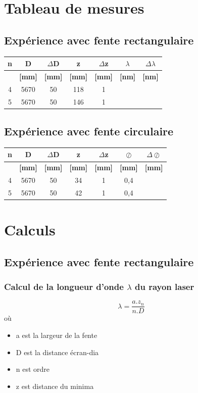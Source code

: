\documentclass[11pt,a4paper]{report}
\begin{document}
	\section{Tableau de mesures}
	\subsection{Expérience avec fente rectangulaire}
	\begin{center}	
	\begin{tabular}{|c|c|c|c|c|c|c|}
		\hline
		\bf n & \bf D & \bf $\Delta$D & \bf z & \bf $\Delta$z & \bf $\lambda$& \bf $\Delta\lambda$ \\
		\hline
		 & \bf [mm] & \bf [mm] & \bf [mm] & \bf [mm] & \bf [nm]  & \bf [nm] \\
		\hline
		4 & 5670 & 50 & 118 &  1 & &  \\
		5 & 5670 & 50 & 146 &  1 & & \\
		\hline
	\end{tabular}
	\end{center}
	\subsection{Expérience avec fente circulaire}
	\begin{center}
	
	\begin{tabular}{|c|c|c|c|c|c|c|}
		\hline
		\bf n & \bf D & \bf $\Delta$D & \bf z & \bf $\Delta$z & \bf $\oslash$& \bf $\Delta\oslash$ \\
		\hline
		 & \bf [mm] & \bf [mm] & \bf [mm] & \bf [mm] & \bf [mm]  & \bf [mm] \\
		\hline
		4 & 5670 & 50 & 34&  1 &0,4&  \\
		5 & 5670 & 50 & 42&  1 &0,4& \\
		\hline
	\end{tabular}
	\end{center}	
	\section{Calculs}
		\subsection{Expérience avec fente rectangulaire}
		\subsubsection{Calcul de la longueur d'onde $\lambda$ du rayon laser}
		\begin{equation}
		\lambda = \frac{a.z_{n}}{n.D}		
		\end{equation}		 
		où
		 \begin{itemize}
		  \item a est la largeur de la fente
		  \item D est la distance écran-dia
		  \item n est ordre
		  \item z est distance du minima 
		 \end{itemize}
		
\end{document}
